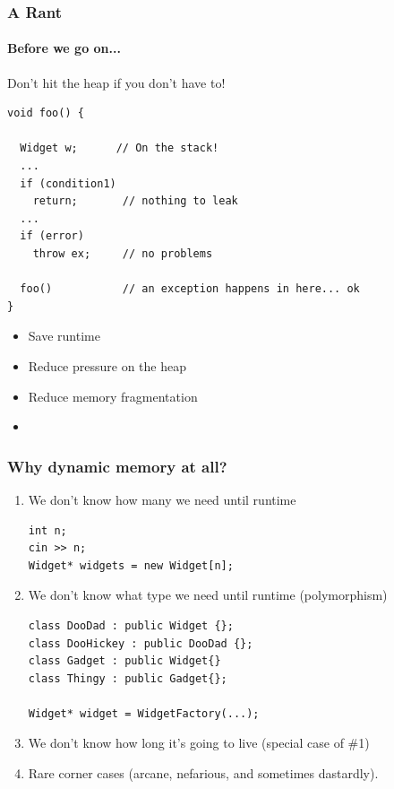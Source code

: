 \begin{frame}[fragile,t]
\frametitle{A Rant}
\framesubtitle{Before we go on...}
Don't hit the heap if you don't have to!

{\scriptsize \begin{verbatim}
void foo() {

  Widget w;      // On the stack!
  ...
  if (condition1)
    return;       // nothing to leak
  ...
  if (error)
    throw ex;     // no problems

  foo()           // an exception happens in here... ok
}
\end{verbatim}}
\pause{}
\begin{itemize}
\item Save runtime
\item Reduce pressure on the heap
\item Reduce memory fragmentation
\pause{}
\item {}
\end{itemize}

\end{frame}


\begin{frame}[fragile,t]
\frametitle{Why dynamic memory at all?}
\vskip 6pt
\pause{}

\begin{enumerate}
\item We don't know how many we need until runtime
{\scriptsize \begin{verbatim}
int n;
cin >> n;
Widget* widgets = new Widget[n];
\end{verbatim}
}
\pause{}
\item We don't know what type we need until runtime (polymorphism)
{\scriptsize \begin{verbatim}
class DooDad : public Widget {};
class DooHickey : public DooDad {};
class Gadget : public Widget{}
class Thingy : public Gadget{};

Widget* widget = WidgetFactory(...);
\end{verbatim}
}
\pause{}
\item We don't know how long it's going to live (special case of \#1)
\item Rare corner cases (arcane, nefarious, and sometimes dastardly).
\end{enumerate}

\vskip 12pt
\pause{}

\end{frame}
